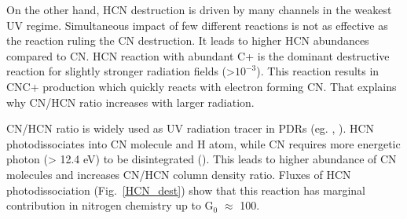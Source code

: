 \documentclass{aa}
\begin{document}
On the other hand, HCN destruction is driven by many channels in the weakest UV regime. Simultaneous impact of few different reactions is not as effective as the reaction ruling the CN destruction. It leads to higher HCN abundances compared to CN. HCN reaction with abundant C+ is the dominant destructive reaction for slightly stronger radiation fields (>$10^{-3}$). This reaction results in CNC+ production which quickly reacts with electron forming CN. That explains why CN/HCN ratio increases with larger radiation. 

CN/HCN ratio is widely used as UV radiation tracer in PDRs (eg. \citealt{Thi04}, \citealt{Han15}). HCN photodissociates into CN molecule and H atom, while CN requires more energetic photon (> 12.4 eV) to be disintegrated (\citealt{vDi87}). This leads to higher abundance of CN molecules and increases CN/HCN column density ratio. Fluxes of HCN photodissociation (Fig.~\ref{HCN_dest}) show that this reaction has marginal contribution in nitrogen chemistry up to G$_0$ $\approx$ 100.
\end{document}

